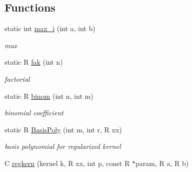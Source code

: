 \subsection*{Functions}
\begin{DoxyCompactItemize}
\item 
\hypertarget{group__applications__fastsum_ga6bc571f685f894e15b83a848a0a30faa}{static int \hyperlink{group__applications__fastsum_ga6bc571f685f894e15b83a848a0a30faa}{max\-\_\-i} (int a, int b)}\label{group__applications__fastsum_ga6bc571f685f894e15b83a848a0a30faa}

\begin{DoxyCompactList}\small\item\em max \end{DoxyCompactList}\item 
\hypertarget{group__applications__fastsum_gab371c18008454ee9d80a2edfad754b0f}{static R \hyperlink{group__applications__fastsum_gab371c18008454ee9d80a2edfad754b0f}{fak} (int n)}\label{group__applications__fastsum_gab371c18008454ee9d80a2edfad754b0f}

\begin{DoxyCompactList}\small\item\em factorial \end{DoxyCompactList}\item 
\hypertarget{group__applications__fastsum_ga22a0da75081664d0ef1ab899f25db944}{static R \hyperlink{group__applications__fastsum_ga22a0da75081664d0ef1ab899f25db944}{binom} (int n, int m)}\label{group__applications__fastsum_ga22a0da75081664d0ef1ab899f25db944}

\begin{DoxyCompactList}\small\item\em binomial coefficient \end{DoxyCompactList}\item 
\hypertarget{group__applications__fastsum_gaefa4ee292e1544e1bbcca5a6211134f1}{static R \hyperlink{group__applications__fastsum_gaefa4ee292e1544e1bbcca5a6211134f1}{Basis\-Poly} (int m, int r, R xx)}\label{group__applications__fastsum_gaefa4ee292e1544e1bbcca5a6211134f1}

\begin{DoxyCompactList}\small\item\em basis polynomial for regularized kernel \end{DoxyCompactList}\item 
\hypertarget{group__applications__fastsum_gac2308141cb9d43efd6c44a04a1dcaab0}{C \hyperlink{group__applications__fastsum_gac2308141cb9d43efd6c44a04a1dcaab0}{regkern} (kernel k, R xx, int p, const R $\ast$param, R a, R b)}\label{group__applications__fastsum_gac2308141cb9d43efd6c44a04a1dcaab0}


\end{DoxyCompactItemize}
